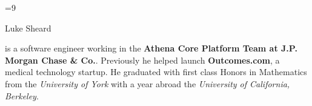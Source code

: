 \documentclass{article}
\newcommand{\social}[3]{
   	#1
   	\hspace{10pt}
	\href{#2}{#3}
}
\begin{document}
\color{body}

=9\relax     %

\raggedright

\fontsize{10pt}{13pt}\selectfont


{\Huge Luke Sheard}

\vspace{10pt}

is a software engineer working in the \textbf{Athena Core Platform Team at J.P. Morgan Chase \& Co.}. Previously he helped launch \textbf{Outcomes.com}, a medical technology startup. He graduated with first class Honors in Mathematics from the \textit{University of York} with a year abroad the \textit{University of California, Berkeley}.

\vspace{5pt}


\vspace{15pt}
\end{document}
